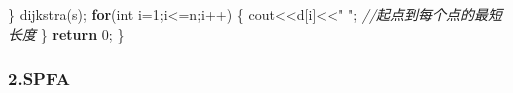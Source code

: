 \documentclass[
]{article}
\newenvironment{Shaded}{}{}
\newcommand{\CommentTok}[1]{\textcolor[rgb]{0.38,0.63,0.69}{\textit{#1}}}
\newcommand{\ControlFlowTok}[1]{\textcolor[rgb]{0.00,0.44,0.13}{\textbf{#1}}}
\newcommand{\DataTypeTok}[1]{\textcolor[rgb]{0.56,0.13,0.00}{#1}}
\newcommand{\DecValTok}[1]{\textcolor[rgb]{0.25,0.63,0.44}{#1}}
\newcommand{\NormalTok}[1]{#1}
\newcommand{\OperatorTok}[1]{\textcolor[rgb]{0.40,0.40,0.40}{#1}}
\newcommand{\StringTok}[1]{\textcolor[rgb]{0.25,0.44,0.63}{#1}}
\begin{document}
\begin{Shaded}
\begin{Highlighting}[]
	\OperatorTok{\}}
\NormalTok{	dijkstra}\OperatorTok{(}\NormalTok{s}\OperatorTok{);}
	\ControlFlowTok{for}\OperatorTok{(}\DataTypeTok{int}\NormalTok{ i}\OperatorTok{=}\DecValTok{1}\OperatorTok{;}\NormalTok{i}\OperatorTok{\textless{}=}\NormalTok{n}\OperatorTok{;}\NormalTok{i}\OperatorTok{++)} \OperatorTok{\{}
\NormalTok{		cout}\OperatorTok{\textless{}\textless{}}\NormalTok{d}\OperatorTok{[}\NormalTok{i}\OperatorTok{]\textless{}\textless{}}\StringTok{" "}\OperatorTok{;}  \CommentTok{//起点到每个点的最短长度 }
	\OperatorTok{\}}
	\ControlFlowTok{return} \DecValTok{0}\OperatorTok{;}
\OperatorTok{\}}
\end{Highlighting}
\end{Shaded}

\hypertarget{2spfa}{%
\subsubsection{2.SPFA}\label{2spfa}}
\end{document}
